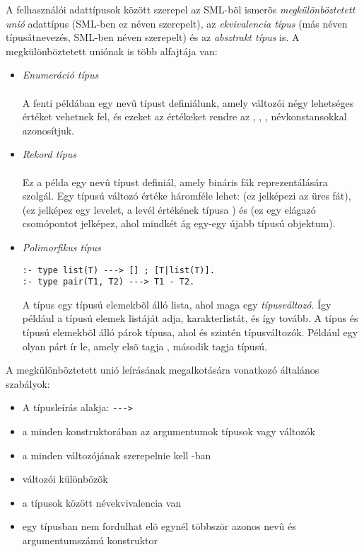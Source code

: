 A felhasználói adattípusok között szerepel az SML-bõl ismerõs \emph{megkülönböztetett
unió} adattípus (SML-ben ez  néven szerepelt), az \emph{ekvivalencia típus}
(más néven típusátnevezés, SML-ben  néven szerepelt) és az
\emph{absztrakt típus} is. A megkülönböztetett uniónak is több alfajtája van:

\begin{itemize}
\item \emph{Enumeráció típus} \\
 \\
A fenti példában egy  nevû típust definiálunk, amely változói négy lehetséges
értéket vehetnek fel, és ezeket az értékeket rendre az , ,
,  névkonstansokkal azonosítjuk.
\item \emph{Rekord típus} \\
 \\
Ez a példa egy  nevû típust definiál, amely bináris fák reprezentálására
szolgál. Egy  típusú változó értéke háromféle lehet:  (ez
jelképezi az üres fát),  (ez jelképez egy levelet, a levél értékének
típusa ) és  (ez egy elágazó csomópontot jelképez,
ahol mindkét ág egy-egy újabb  típusú objektum).
\item \emph{Polimorfikus típus} \\
\begin{verbatim}
:- type list(T) ---> [] ; [T|list(T)].
:- type pair(T1, T2) ---> T1 - T2.
\end{verbatim}
A  típus egy  típusú elemekbõl álló lista, ahol  maga
egy \emph{típusváltozó}. Így például a   típusú elemek
listáját adja,  karakterlistát, és így tovább. A 
típus  és  típusú elemekbõl álló párok típusa, ahol  és
 szintén típusváltozók. Például  egy olyan párt ír
le, amely elsõ tagja , második tagja  típusú.
\end{itemize}

A megkülönböztetett unió leírásának megalkotására vonatkozó általános szabályok:

\begin{itemize}
\item A típusleírás alakja:   \verb`--->` 
\item a  minden konstruktorában az argumentumok típusok vagy változók
\item a  minden változójának szerepelnie kell -ban
\item {} változói különbözõk
\item a típusok között névekvivalencia van
\item egy típusban nem fordulhat elõ egynél többször azonos nevû és
argumentumszámú konstruktor
\end{itemize}

